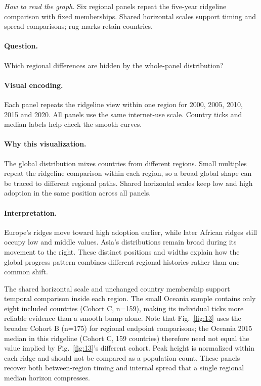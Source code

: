 \documentclass[conference,a4paper]{IEEEtran}
\begin{document}
\noindent\textit{How to read the graph.} Six regional panels repeat the five-year ridgeline comparison with fixed memberships. Shared horizontal scales support timing and spread comparisons; rug marks retain countries.

\paragraph{Question.} Which regional differences are hidden by the whole-panel distribution?



\paragraph{Visual encoding.} Each panel repeats the ridgeline view within one region for 2000, 2005, 2010, 2015 and 2020. All panels use the same internet-use scale. Country ticks and median labels help check the smooth curves.



\paragraph{Why this visualization.} The global distribution mixes countries from different regions. Small multiples repeat the ridgeline comparison within each region, so a broad global shape can be traced to different regional paths. Shared horizontal scales keep low and high adoption in the same position across all panels.



\paragraph{Interpretation.} Europe's ridges move toward high adoption earlier, while later African ridges still occupy low and middle values. Asia's distributions remain broad during its movement to the right. These distinct positions and widths explain how the global progress pattern combines different regional histories rather than one common shift.

The shared horizontal scale and unchanged country membership support temporal comparison inside each region. The small Oceania sample contains only eight included countries (Cohort C, n=159), making its individual ticks more reliable evidence than a smooth bump alone. Note that Fig.~\ref{fig:13} uses the broader Cohort B (n=175) for regional endpoint comparisons; the Oceania 2015 median in this ridgeline (Cohort C, 159 countries) therefore need not equal the value implied by Fig.~\ref{fig:13}'s different cohort. Peak height is normalized within each ridge and should not be compared as a population count. These panels recover both between-region timing and internal spread that a single regional median horizon compresses.
\end{document}
